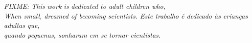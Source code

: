 


\begin{dedicatoria}

    \vspace*{\fill}
    \centering
    \noindent
    \textit{\lang
    {
        FIXME: This work is dedicated to adult children who, \\
        When small, dreamed of becoming scientists.
    }
    {
        Este trabalho é dedicado às crianças adultas que,\\
        quando pequenas, sonharam em se tornar cientistas.
    }}
    \vspace*{\fill}

\end{dedicatoria}


